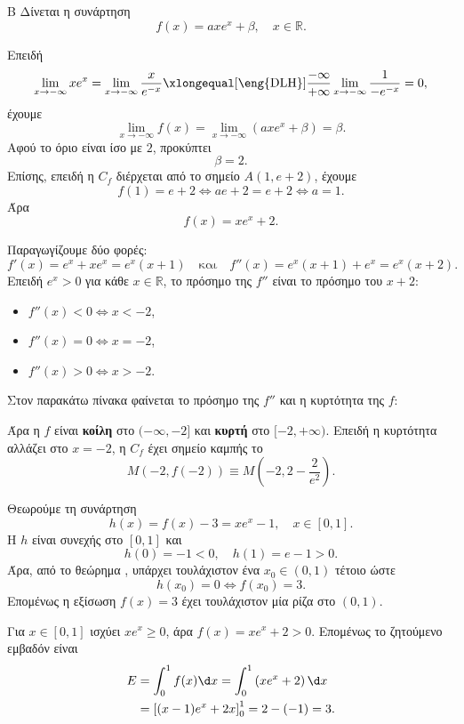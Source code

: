 \begin{thema}{Β}
Δίνεται η συνάρτηση
\[
f(x)=axe^x+\beta,\quad x\in\mathbb{R}.
\]

\begin{erwthma}
\item Επειδή
\[
\lim_{x\to-\infty}xe^x
=\lim_{x\to-\infty}\frac{x}{e^{-x}}
\xlongequal[\text{\eng{DLH}}]{\frac{-\infty}{+\infty}}
\lim_{x\to-\infty}\frac{1}{-e^{-x}}=0,
\]
έχουμε
\[
\lim_{x\to-\infty}f(x)
=\lim_{x\to-\infty}\left(axe^x+\beta\right)
=\beta.
\]
Αφού το όριο είναι ίσο με $2$, προκύπτει
\[
\beta=2.
\]
Επίσης, επειδή η $C_f$ διέρχεται από το σημείο $A(1,e+2)$, έχουμε
\[
f(1)=e+2\Leftrightarrow ae+2=e+2\Leftrightarrow a=1.
\]
Άρα
\[
f(x)=xe^x+2.
\]

\item Παραγωγίζουμε δύο φορές:
\[
f'(x)=e^x+xe^x=e^x(x+1)
\quad\text{και}\quad
f''(x)=e^x(x+1)+e^x=e^x(x+2).
\]
Επειδή $e^x>0$ για κάθε $x\in\mathbb{R}$, το πρόσημο της $f''$ είναι το πρόσημο του $x+2$:
\begin{itemize}
\item $f''(x)<0\Leftrightarrow x<-2$,
\item $f''(x)=0\Leftrightarrow x=-2$,
\item $f''(x)>0\Leftrightarrow x>-2$.
\end{itemize}
Στον παρακάτω πίνακα φαίνεται το πρόσημο της $f''$ και η κυρτότητα της $f$:
\begin{center}
\end{center}
Άρα η $f$ είναι \textbf{κοίλη} στο $(-\infty,-2]$ και \textbf{κυρτή} στο $[-2,+\infty)$. Επειδή η κυρτότητα αλλάζει στο $x=-2$, η $C_f$ έχει σημείο καμπής το
\[
M(-2,f(-2))\equiv M\left(-2,2-\frac{2}{e^2}\right).
\]

\item Θεωρούμε τη συνάρτηση
\[
h(x)=f(x)-3=xe^x-1,\quad x\in[0,1].
\]
Η $h$ είναι συνεχής στο $[0,1]$ και
\[
h(0)=-1<0,\quad h(1)=e-1>0.
\]
Άρα, από το θεώρημα , υπάρχει τουλάχιστον ένα $x_0\in(0,1)$ τέτοιο ώστε
\[
h(x_0)=0\Leftrightarrow f(x_0)=3.
\]
Επομένως η εξίσωση $f(x)=3$ έχει τουλάχιστον μία ρίζα στο $(0,1)$.

\item Για $x\in[0,1]$ ισχύει $xe^x\geq0$, άρα $f(x)=xe^x+2>0$. Επομένως το ζητούμενο εμβαδόν είναι
\begin{align*}
E&=\int_0^1 f(x)\d x
=\int_0^1\left(xe^x+2\right)\d x\\
&=\left[(x-1)e^x+2x\right]_0^1
=2-(-1)=3.
\end{align*}
\end{erwthma}
\end{thema}
